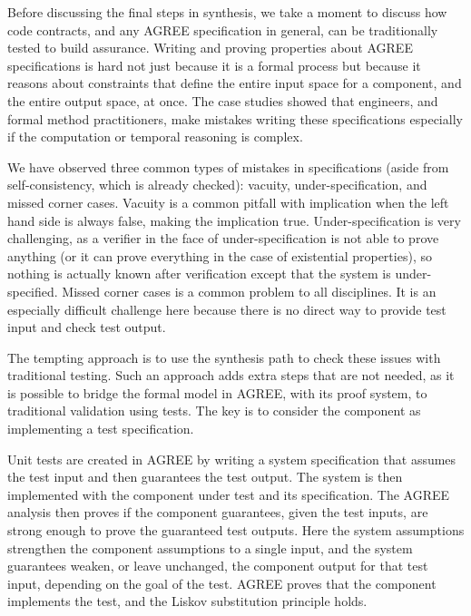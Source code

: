 Before discussing the final steps in synthesis, we take a moment to
discuss how code contracts, and any AGREE specification in general, can be traditionally tested to build assurance.
Writing and proving properties about AGREE specifications is hard not just because it is a formal process but  because it reasons about constraints that define the entire input space for a component, and the entire output space, at once.
The case studies showed that engineers, and formal method practitioners, make mistakes writing these specifications especially if the computation or temporal reasoning is complex.

We have observed three common types of mistakes in specifications (aside from self-consistency, which is
already checked): vacuity, under-specification, and missed corner cases.
Vacuity is a common pitfall with implication when the left hand side is always false, making the implication true. 
Under-specification is very challenging, as a verifier in the face of under-specification is not able to prove anything (or it can prove everything in the case of existential properties), so nothing is actually known after verification except that the system is under-specified. 
Missed corner cases is a common problem to all disciplines.
It is an especially difficult challenge here because there is no direct way to provide test input and check test output.

The tempting approach is to use the synthesis path to check these issues with traditional testing.
Such an approach adds extra steps that are not needed, as it is
possible to bridge the formal model in AGREE, with its proof system, to
traditional validation using tests.
The key is to consider the component as implementing a test specification.

Unit tests are created in AGREE by writing a system specification that assumes the test input and then guarantees the test output.
The system is then implemented with the component under test and its specification.
The AGREE analysis then proves if the component guarantees, given the test inputs, are strong enough to prove the guaranteed test outputs.
Here the system assumptions strengthen the component assumptions to a single input, and the system guarantees weaken, or leave unchanged, the component output for that test input, depending on the goal of the test.
AGREE proves that the component implements the test, and the Liskov substitution principle holds.

